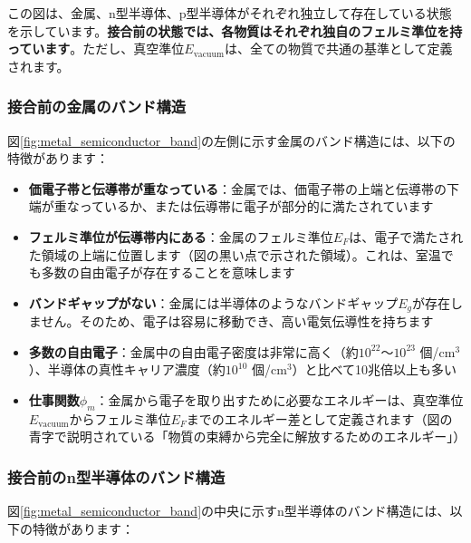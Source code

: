 この図は、金属、n型半導体、p型半導体がそれぞれ独立して存在している状態を示しています。\textbf{接合前の状態では、各物質はそれぞれ独自のフェルミ準位を持っています}。ただし、真空準位$E_{\text{vacuum}}$は、全ての物質で共通の基準として定義されます。

\subsubsection{接合前の金属のバンド構造}

図\ref{fig:metal_semiconductor_band}の左側に示す金属のバンド構造には、以下の特徴があります：

\begin{itemize}
\item \textbf{価電子帯と伝導帯が重なっている}：金属では、価電子帯の上端と伝導帯の下端が重なっているか、または伝導帯に電子が部分的に満たされています

\item \textbf{フェルミ準位が伝導帯内にある}：金属のフェルミ準位$E_F$は、電子で満たされた領域の上端に位置します（図の黒い点で示された領域）。これは、室温でも多数の自由電子が存在することを意味します

\item \textbf{バンドギャップがない}：金属には半導体のようなバンドギャップ$E_g$が存在しません。そのため、電子は容易に移動でき、高い電気伝導性を持ちます

\item \textbf{多数の自由電子}：金属中の自由電子密度は非常に高く（約$10^{22}$〜$10^{23}$ 個/cm$^3$）、半導体の真性キャリア濃度（約$10^{10}$ 個/cm$^3$）と比べて10兆倍以上も多い

\item \textbf{仕事関数$\phi_m$}：金属から電子を取り出すために必要なエネルギーは、真空準位$E_{\text{vacuum}}$からフェルミ準位$E_F$までのエネルギー差として定義されます（図の青字で説明されている「物質の束縛から完全に解放するためのエネルギー」）
\end{itemize}

\subsubsection{接合前のn型半導体のバンド構造}

図\ref{fig:metal_semiconductor_band}の中央に示すn型半導体のバンド構造には、以下の特徴があります：

